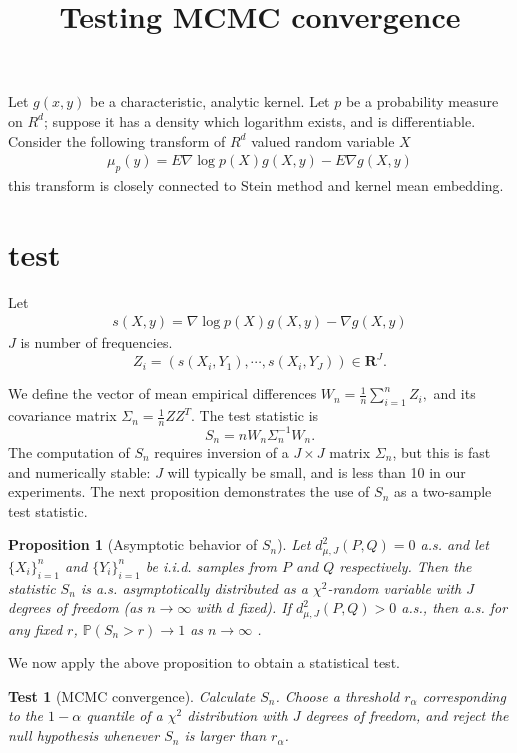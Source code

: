 \documentclass{article}
\title{Testing MCMC convergence}
\author{}
\date{}
\newtheorem{test}{Test}
\newtheorem{proposition}{Proposition}
\begin{document}
\maketitle

Let $g(x,y)$ be a characteristic, analytic kernel. Let $p$ be a probability measure on $R^d$; suppose it has a density which logarithm exists, and is differentiable. Consider the following transform of $R^d$ valued random variable $X$
\begin{align}
 \mu_p(y) = E  \nabla \log p(X) g(X,y) - E \nabla g(X,y)
\end{align}
this transform is closely connected to Stein method and kernel mean embedding.

\section{test}
Let 
\begin{align}
 s(X,y) = \nabla \log p(X) g(X,y) -  \nabla g(X,y)
\end{align}
$J$ is number of frequencies.
\begin{equation}
 Z_i = ( s(X_i,Y_1) , \cdots, s(X_i,Y_J)  )\in \mathbf R^J.
\end{equation}

We define the vector of mean empirical differences 
$W_n = \frac 1  n \sum_{i=1}^n Z_i, $
and its covariance matrix
$\Sigma_n = \frac 1  n Z Z^{T}$.
The test statistic is
\begin{equation}
 S_n = n W_n \Sigma_n^{-1} W_n.
\end{equation}
The computation of $S_n$ requires inversion of a $J\times J$ matrix $\Sigma_n$, but this is fast and numerically stable: $J$ will typically be small, and is less than 10 in our experiments. The next proposition demonstrates the use of $S_n$ as a two-sample test statistic.
\begin{proposition}[Asymptotic behavior of $S_n$]
\label{prop:Hotelling}
 Let $d_{\mu,J}^2(P,Q)=0$ a.s. and let $\{X_i\}_{i=1}^n$ and $\{Y_i\}_{i=1}^n$  be i.i.d. samples from $P$ and $Q$ respectively. Then the statistic $S_n$ is a.s. asymptotically distributed as a $\chi^2$-random variable with $J$ degrees of freedom (as $n \to \infty$ with $d$ fixed). If $d_{\mu,J}^2(P,Q)>0$ a.s., then a.s. for any fixed $r$, $\mathbb P(S_n > r) \to 1$  as $n \to \infty$ .
\end{proposition}
We now apply the above proposition to obtain a statistical test. 

\begin{test}[MCMC convergence]
\label{test}
Calculate $S_n$. Choose a threshold $r_\alpha$ corresponding to the $1-\alpha$ quantile of a  $\chi^2$ distribution with $J$ degrees of freedom, and reject the null hypothesis whenever $S_n$ is larger than $r_\alpha$. 
\end{test}
\end{document}
